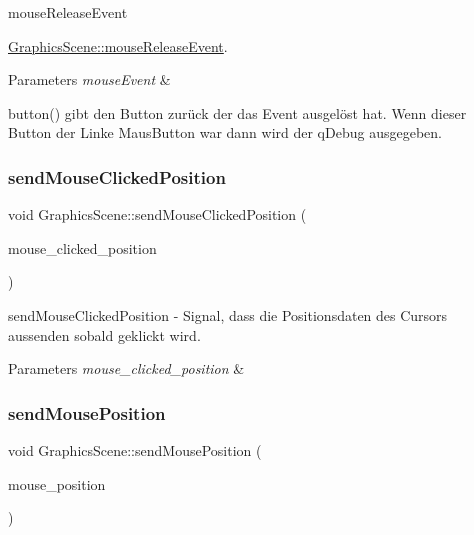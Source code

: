 mouse\+Release\+Event 

\hyperlink{class_graphics_scene_aadc9534ab8b8fbb5e7c02a0b761c750a}{Graphics\+Scene\+::mouse\+Release\+Event}.


\begin{DoxyParams}{Parameters}
{\em mouse\+Event} & \\
\hline
\end{DoxyParams}
button() gibt den Button zurück der das Event ausgelöst hat. Wenn dieser Button der Linke Maus\+Button war dann wird der q\+Debug ausgegeben.\mbox{\label{class_graphics_scene_ac781d598feae85b0a0c6a90c30f914bd}} 
\subsubsection{\texorpdfstring{send\+Mouse\+Clicked\+Position}{sendMouseClickedPosition}}
{\footnotesize\ttfamily void Graphics\+Scene\+::send\+Mouse\+Clicked\+Position (\begin{DoxyParamCaption}\item[{Q\+PointF}]{mouse\+\_\+clicked\+\_\+position }\end{DoxyParamCaption})\hspace{0.3cm}{\ttfamily [signal]}}



send\+Mouse\+Clicked\+Position -\/ Signal, dass die Positionsdaten des Cursors aussenden sobald geklickt wird. 


\begin{DoxyParams}{Parameters}
{\em mouse\+\_\+clicked\+\_\+position} & \\
\hline
\end{DoxyParams}
\mbox{\label{class_graphics_scene_aee2d967bd98adf009edf0ecd08cec189}} 
\subsubsection{\texorpdfstring{send\+Mouse\+Position}{sendMousePosition}}
{\footnotesize\ttfamily void Graphics\+Scene\+::send\+Mouse\+Position (\begin{DoxyParamCaption}\item[{Q\+PointF}]{mouse\+\_\+position }\end{DoxyParamCaption})\hspace{0.3cm}{\ttfamily [signal]}}



